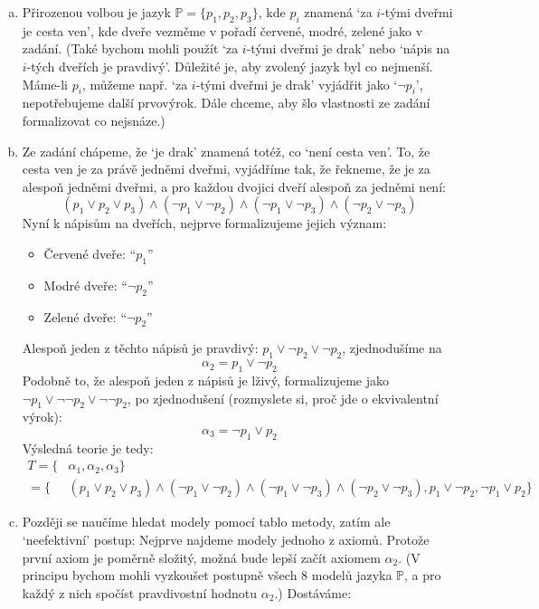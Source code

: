 \documentclass[a4paper,11pt]{amsart}
\begin{document}
\begin{problem}
    \begin{solution}
        \begin{enumerate}[(a)]
            \item Přirozenou volbou je jazyk $\mathbb P=\{p_1, p_2, p_3\}$, kde $p_i$ znamená `za $i$-tými dveřmi je cesta ven', kde dveře vezměme v pořadí červené, modré, zelené jako v zadání. (Také bychom mohli použít `za $i$-tými dveřmi je drak' nebo `nápis na $i$-tých dveřích je pravdivý'. Důležité je, aby zvolený jazyk byl co nejmenší. Máme-li $p_i$, můžeme např. `za $i$-tými dveřmi je drak' vyjádřit jako `$\neg p_i$', nepotřebujeme další prvovýrok. Dále chceme, aby šlo vlastnosti ze zadání formalizovat co nejsnáze.)
            \item Ze zadání chápeme, že `je drak' znamená totéž, co `není cesta ven'. To, že cesta ven je za právě jedněmi dveřmi, vyjádříme tak, že řekneme, že je za alespoň jedněmi dveřmi, a pro každou dvojici dveří alespoň za jedněmi není:
            $$
            (p_1\lor p_2\lor p_3) \land (\neg p_1\lor\neg p_2) \land  (\neg p_1\lor\neg p_3) \land (\neg p_2\lor\neg p_3)
            $$
            Nyní k nápisům na dveřích, nejprve formalizujeme jejich význam:
            \begin{itemize}
                \item Červené dveře: ``$p_1$''
                \item Modré dveře: ``$\neg p_2$''
                \item Zelené dveře: ``$\neg p_2$''
            \end{itemize}
            Alespoň jeden z těchto nápisů je pravdivý: $p_1\lor \neg p_2\lor\neg p_2$, zjednodušíme na
            $$
            \alpha_2=p_1\lor \neg p_2
            $$
            Podobně to, že alespoň jeden z nápisů je lživý, formalizujeme jako $\neg p_1\lor \neg \neg p_2\lor\neg \neg p_2$, po zjednodušení (rozmyslete si, proč jde o ekvivalentní výrok):
            $$
            \alpha_3=\neg p_1\lor p_2
            $$
            Výsledná teorie je tedy:
            \begin{align*}
                T=\{&\alpha_1,\alpha_2,\alpha_3\}\\=\{&(p_1\lor p_2\lor p_3) \land (\neg p_1\lor\neg p_2) \land  (\neg p_1\lor\neg p_3) \land (\neg p_2\lor\neg p_3), p_1\lor \neg p_2, \neg p_1\lor p_2\}
            \end{align*}
            \item Později se naučíme hledat modely pomocí tablo metody, zatím ale `neefektivní' postup: Nejprve najdeme modely jednoho z axiomů. Protože první axiom je poměrně složitý, možná bude lepší začít axiomem $\alpha_2$. (V principu bychom mohli vyzkoušet postupně všech 8 modelů jazyka $\mathbb P$, a pro každý z nich spočíst pravdivostní hodnotu $\alpha_2$.) Dostáváme:

\end{enumerate}
\end{solution}
\end{problem}
\end{document}
